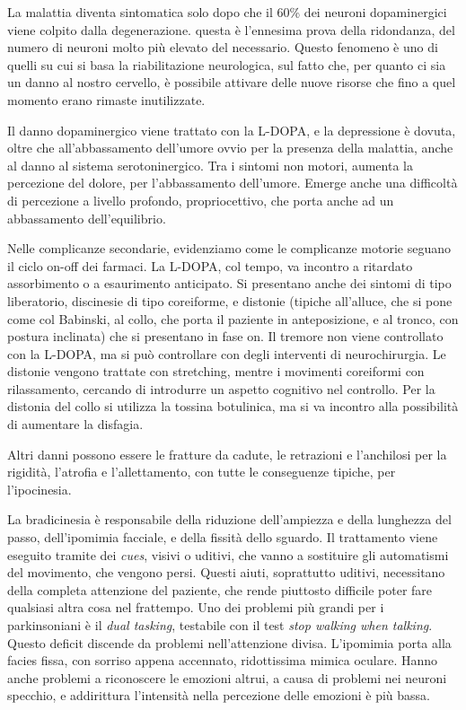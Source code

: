 La malattia diventa sintomatica solo dopo che il 60\% dei neuroni 
dopaminergici viene colpito dalla degenerazione. questa è l'ennesima prova 
della ridondanza, del numero di neuroni molto più elevato del necessario. 
Questo fenomeno è uno di quelli su cui si basa la riabilitazione neurologica, 
sul fatto che, per quanto ci sia un danno al nostro cervello, è possibile 
attivare delle nuove risorse che fino a quel momento erano rimaste inutilizzate.

Il danno dopaminergico viene trattato con la L-DOPA, e la depressione è 
dovuta, oltre che all'abbassamento dell'umore ovvio per la presenza della 
malattia, anche al danno al sistema serotoninergico.
Tra i sintomi non motori, aumenta la percezione del dolore, per l'abbassamento 
dell'umore. Emerge anche una difficoltà di percezione a livello profondo, 
propriocettivo, che porta anche ad un abbassamento dell'equilibrio.

Nelle complicanze secondarie, evidenziamo come le complicanze motorie seguano 
il ciclo on-off dei farmaci. La L-DOPA, col tempo, va incontro a ritardato 
assorbimento o a esaurimento anticipato. Si presentano anche dei sintomi di 
tipo liberatorio, discinesie di tipo coreiforme, e distonie (tipiche 
all'alluce, 
che si pone come col Babinski, al collo, che porta il paziente in 
anteposizione, 
e al tronco, con postura inclinata) che si presentano in fase on. Il tremore 
non viene controllato con la L-DOPA, ma si può controllare con degli 
interventi di neurochirurgia. Le distonie vengono trattate con stretching, mentre i 
movimenti coreiformi con rilassamento, cercando di introdurre un aspetto 
cognitivo nel controllo. Per la distonia del collo si utilizza la tossina 
botulinica, ma si va incontro alla possibilità di aumentare la disfagia. 

Altri danni possono essere le fratture da cadute, le retrazioni e l'anchilosi 
per la rigidità, l'atrofia e l'allettamento, con tutte le conseguenze tipiche, 
per l'ipocinesia.

La bradicinesia è responsabile della riduzione dell'ampiezza e della lunghezza 
del passo, dell'ipomimia facciale, e della fissità dello sguardo. Il 
trattamento viene eseguito tramite dei \textit{cues}, visivi o uditivi, che 
vanno a sostituire gli automatismi del movimento, che vengono persi. Questi 
aiuti, soprattutto uditivi, necessitano della completa attenzione del paziente, 
che rende piuttosto difficile poter fare qualsiasi altra cosa nel frattempo. 
Uno dei problemi più grandi per i parkinsoniani è il \textit{dual tasking}, 
testabile con il test \textit{stop walking when talking}. Questo deficit 
discende da problemi nell'attenzione divisa. L'ipomimia porta alla facies 
fissa, con sorriso appena accennato, ridottissima mimica oculare. Hanno anche 
problemi a riconoscere le emozioni altrui, a causa di problemi nei neuroni 
specchio, e addirittura l'intensità nella percezione delle emozioni è più 
bassa.

